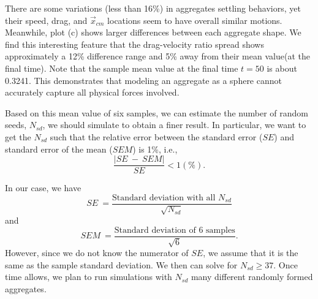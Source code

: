 There are some variations (less than 16\%) in aggregates settling behaviors, yet their speed, drag, and $\vec{x}_{cm}$ locations seem to have overall similar motions. 
Meanwhile, plot (c) shows larger differences between each aggregate shape. 
We find this interesting feature that the drag-velocity ratio spread shows approximately a 12\% difference range and 5\% away from their mean value(at the final time). 
Note that the sample mean value at the final time $t = 50$ is about 0.3241.
This demonstrates that modeling an aggregate as a sphere cannot accurately capture all physical forces involved.
\par
Based on this mean value of six samples, we can estimate the number of random seeds, $N_{sd}$, we should simulate to obtain a finer result. In particular, we want to get the $N_{sd}$ such that the relative error between the standard error ($SE$) and standard error of the mean ($SEM$) is 1\%, i.e.,
\begin{equation}
	\frac{|SE \ - \ SEM|}{SE} < 1 (\%).	
\end{equation}

In our case, we have
\begin{equation}
	SE \ = \frac{\text{Standard deviation with all  } N_{sd}}{\sqrt{N_{sd}}}
\end{equation}
and
\begin{equation}
	SEM \ = \frac{\text{Standard deviation of 6 samples}}{\sqrt{6}}.
\end{equation}
However, since we do not know the numerator of $SE$, we assume that it is the same as the sample standard deviation. We then can solve for $N_{sd} \geq 37$. Once time allows, we plan to run simulations with $N_{sd}$ many different randomly formed aggregates. 

